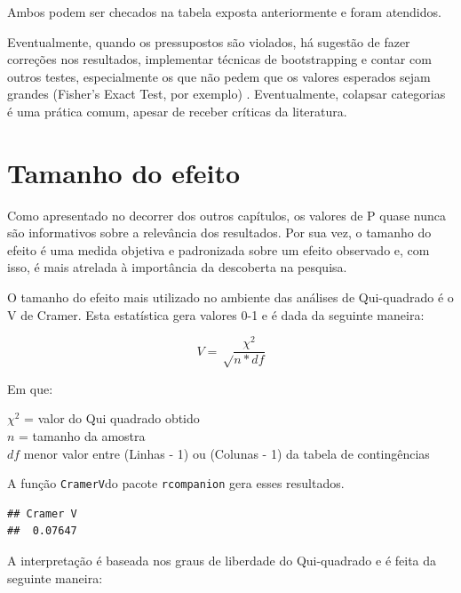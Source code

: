 \documentclass[
]{book}
\newenvironment{Shaded}{\begin{snugshade}}{\end{snugshade}}
\newcommand{\FunctionTok}[1]{\textcolor[rgb]{0.00,0.00,0.00}{#1}}
\newcommand{\NormalTok}[1]{#1}
\newcommand{\SpecialCharTok}[1]{\textcolor[rgb]{0.00,0.00,0.00}{#1}}
\begin{document}
Ambos podem ser checados na tabela exposta anteriormente e foram atendidos.

Eventualmente, quando os pressupostos são violados, há sugestão de fazer correções nos resultados, implementar técnicas de bootstrapping e contar com outros testes, especialmente os que não pedem que os valores esperados sejam grandes (Fisher's Exact Test, por exemplo) \citep{Campbell2007}. Eventualmente, colapsar categorias é uma prática comum, apesar de receber críticas da literatura.

\hypertarget{tamanho-do-efeito}{%
\section{Tamanho do efeito}\label{tamanho-do-efeito}}

Como apresentado no decorrer dos outros capítulos, os valores de P quase nunca são informativos sobre a relevância dos resultados. Por sua vez, o tamanho do efeito é uma medida objetiva e padronizada sobre um efeito observado e, com isso, é mais atrelada à importância da descoberta na pesquisa.

O tamanho do efeito mais utilizado no ambiente das análises de Qui-quadrado é o V de Cramer. Esta estatística gera valores 0-1 e é dada da seguinte maneira:

\[V=\sqrt\frac{\chi^2}{n*df}\]

Em que:

\(\chi^2\) = valor do Qui quadrado obtido\\
\(n\) = tamanho da amostra\\
\(df\) menor valor entre (Linhas - 1) ou (Colunas - 1) da tabela de contingências

A função \texttt{CramerV}do pacote \texttt{rcompanion} gera esses resultados.

\begin{Shaded}
\end{Shaded}

\begin{verbatim}
## Cramer V 
##  0.07647
\end{verbatim}

A interpretação é baseada nos graus de liberdade do Qui-quadrado e é feita da seguinte maneira:
\end{document}

